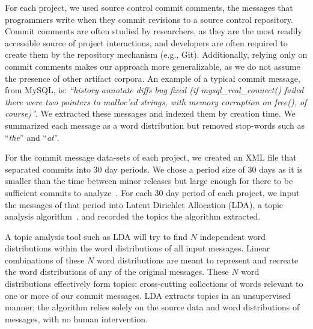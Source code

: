 \documentclass[]{sig-alternate}
\begin{document}
For each project, we used source control commit comments, the messages
that programmers write when they commit revisions to a source control
repository. 
Commit comments are often studied by researchers, as they are the most readily accessible source of project interactions, and developers are often required to create them by the repository mechanism (e.g., Git).  Additionally, relying only on commit comments makes our approach more generalizable, as we do not assume the presence of other artifact corpora.
An example of a typical commit message, from MySQL, is: \textit{``history annotate diffs bug fixed (if mysql\-\_real\-\_connect() failed there were two pointers to malloc'ed strings, with memory corruption on free(), of course)''}. 
We extracted these messages and indexed them by creation time. 
We summarized each message as a word distribution but removed stop-words such as ``\emph{the}'' and ``\emph{at}''. 

For the commit message data-sets of each project, we created an XML file that separated commits into 30 day periods. 
We chose a period size of 30 days as it is smaller than the time between minor releases but large enough for there to be sufficient commits to analyze~\cite{Hindle09ICSM}. 
For each 30 day period of each project, we input the messages of that period into Latent Dirichlet Allocation (LDA), a topic analysis algorithm~\cite{Blei2003}, and recorded the topics the algorithm extracted.

A topic analysis tool such as LDA will try to find $N$ independent
word distributions within the word distributions of all input messages. 
Linear combinations of these $N$ word distributions are meant to represent and recreate the word distributions of any of the original messages. 
These $N$ word distributions effectively form topics: cross-cutting collections of words relevant to one or more of our commit messages. 
LDA extracts topics in an unsupervised manner; the algorithm relies
solely on the source data and word distributions of messages, with no human intervention.
\end{document}
